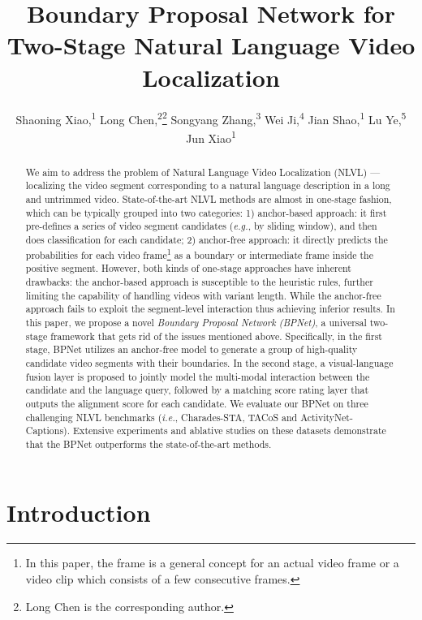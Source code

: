 \documentclass[letterpaper]{article} %
\title{Boundary Proposal Network for Two-Stage Natural Language Video Localization}
\author {
        Shaoning Xiao,\textsuperscript{\rm 1}
        Long Chen,\textsuperscript{\rm 2}\thanks{Long Chen is the corresponding author.}
        Songyang Zhang,\textsuperscript{\rm 3}
        Wei Ji,\textsuperscript{\rm 4}
        Jian Shao,\textsuperscript{\rm 1}
        Lu Ye,\textsuperscript{\rm 5}
        Jun Xiao\textsuperscript{\rm 1} \\
}
\newcommand{\ie}{\emph{i.e.}}
\newcommand{\eg}{\emph{e.g.}}
\begin{document}
\maketitle

\begin{abstract}
We aim to address the problem of Natural Language Video Localization (NLVL) --- localizing the video segment corresponding to
a natural language description in a long and untrimmed video.
State-of-the-art NLVL methods are almost in one-stage fashion, which can be typically grouped into two categories:
1) anchor-based approach: it first pre-defines a series of video segment candidates (\eg, by sliding window), and then does classification for each candidate;
2) anchor-free approach: it directly predicts the probabilities for each video frame\footnote{In this paper, the frame is a general concept for an actual video frame or a video clip which consists of a few consecutive frames.}
as a boundary or intermediate frame inside the positive segment.
However, both kinds of one-stage approaches have inherent drawbacks: the anchor-based approach is susceptible to the heuristic rules, further limiting the capability of handling videos with variant length.
While the anchor-free approach fails to exploit the segment-level interaction thus achieving inferior results.
In this paper, we propose a novel \emph{Boundary Proposal Network (BPNet)}, a universal two-stage framework that gets rid of the issues mentioned above.
Specifically, in the first stage, BPNet utilizes an anchor-free model to generate a group of high-quality candidate video segments with their boundaries.
In the second stage, a visual-language fusion layer is proposed to jointly model the multi-modal interaction between the candidate and the language query, followed by a matching score rating layer that outputs the alignment score for each candidate.
We evaluate our BPNet on three challenging NLVL benchmarks (\ie, Charades-STA, TACoS and ActivityNet-Captions).
Extensive experiments and ablative studies on these datasets demonstrate that the BPNet outperforms the state-of-the-art methods.
\end{abstract}

\section{Introduction}
\end{document}
